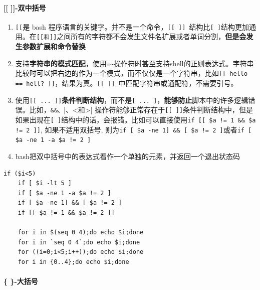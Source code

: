 \documentclass[UTF8,a4paper,12pt]{ctexbook}
\begin{document}
			\paragraph{[[ ]]-双中括号}
				\begin{enumerate}
					\item \verb|[[|是 bash 程序语言的关键字。并不是一个命令，\verb|[[ ]] |结构比\verb|[ ]|结构更加通用。在\verb|[[和]]|之间所有的字符都不会发生文件名扩展或者单词分割，\textbf{但是会发生参数扩展和命令替换}
					
					\item 支持\textbf{字符串的模式匹配}，使用\verb|=~|操作符时甚至支持shell的正则表达式。字符串比较时可以把右边的作为一个模式，而不仅仅是一个字符串，比如\verb|[[ hello == hell? ]]|，结果为真。\verb|[[ ]] |中匹配字符串或通配符，不需要引号。
					
					\item 使用\verb|[[ ... ]]|\textbf{条件判断结构}，而不是\verb|[ ... ]|，\textbf{能够防止}脚本中的许多逻辑错误。比如，\verb|&&、||、<和>| 操作符能够正常存在于\verb|[[ ]]|条件判断结构中，但是如果出现在\verb|[ ]|结构中的话，会报错。比如可以直接使用\verb|if [[ $a != 1 && $a != 2 ]]|, 如果不适用双括号, 则为\verb|if [ $a -ne 1] && [ $a != 2 ]|或者\verb|if [ $a -ne 1 -a $a != 2 ]|
					
					\item bash把双中括号中的表达式看作一个单独的元素，并返回一个退出状态码
				\end{enumerate}
				
				\begin{lstlisting}[frame=L]
	if ($i<5)    
	if [ $i -lt 5 ]    
	if [ $a -ne 1 -a $a != 2 ]    
	if [ $a -ne 1] && [ $a != 2 ]    
	if [[ $a != 1 && $a != 2 ]]    
	
	for i in $(seq 0 4);do echo $i;done    
	for i in `seq 0 4`;do echo $i;done    
	for ((i=0;i<5;i++));do echo $i;done    
	for i in {0..4};do echo $i;done    				
				\end{lstlisting}
			\paragraph{\{ \}-大括号}
\end{document}
